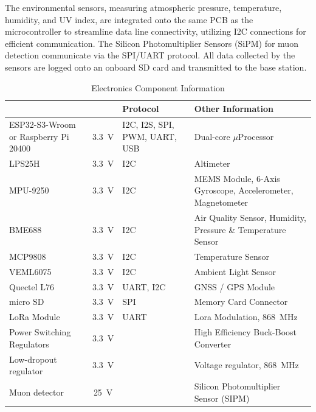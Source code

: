 The environmental sensors, measuring atmospheric pressure, temperature, humidity, and UV index, are integrated onto the same PCB as the microcontroller to streamline data line connectivity, utilizing I2C connections for efficient communication. The Silicon Photomultiplier Sensors (SiPM) for muon detection communicate via the SPI/UART protocol. All data collected by the sensors are logged onto an onboard SD card and transmitted to the base station.


\begin{table}[htbp]
\centering
{}
\begin{tabularx}{0.95\textwidth}{>{\raggedright\arraybackslash}p{3.5cm}c>{\raggedright\arraybackslash}X>{\raggedright\arraybackslash}p{5.5cm}}
\hline
\rowcolor{DeepSkyBlue4}
\textbf{\color{white!50}{Component}} & \textbf{\color{white!50}{Voltage}} & \textbf{\color{white!50}\textbf{Protocol}} & \textbf{\color{white!50}\textbf{Other Information}} \\ \hline
\rowcolors{2}{red}{}
ESP32-S3-Wroom or Raspberry Pi 20400& \SI{3.3}{\volt} & I2C, I2S, SPI, PWM, UART, USB & {Dual-core $\mu$Processor}\\ %
\rowcolor{LightCyan1!50}LPS25H & \SI{3.3}{\volt} & I2C & Altimeter\\ %
MPU-9250 & \SI{3.3}{\volt} & I2C & MEMS Module, 6-Axis Gyroscope,\/ Accelerometer,\/ Magnetometer\\ %
\rowcolor{LightCyan1!50}BME688 & \SI{3.3}{\volt} & I2C & Air Quality Sensor, Humidity, Pressure \& Temperature Sensor\\ %
MCP9808 & \SI{3.3}{\volt} & I2C & Temperature Sensor\\ %
\rowcolor{LightCyan1!50}VEML6075 & \SI{3.3}{\volt} & I2C & Ambient Light Sensor\\ %
Quectel L76 & \SI{3.3}{\volt} & UART, I2C & GNSS / GPS Module\\ %
\rowcolor{LightCyan1!50}micro SD & \SI{3.3}{\volt} & SPI & Memory Card Connector\\ %
LoRa Module& \SI{3.3}{\volt} & UART & Lora Modulation, \SI{868}{\mega\hertz} \\ %
\rowcolor{LightCyan1!50}Power Switching Regulators & \SI{3.3}{\volt} & & High Efficiency Buck-Boost Converter  \\ %
Low-dropout regulator& \SI{3.3}{\volt} & & Voltage regulator, \SI{868}{\mega\hertz} \\ %
\rowcolor{LightCyan1!50}Muon detector & \SI{25}{\volt} & & Silicon Photomultiplier Sensor (SIPM)  \\ %
\end{tabularx}
\caption{\small{Electronics Component Information}}
\end{table}

